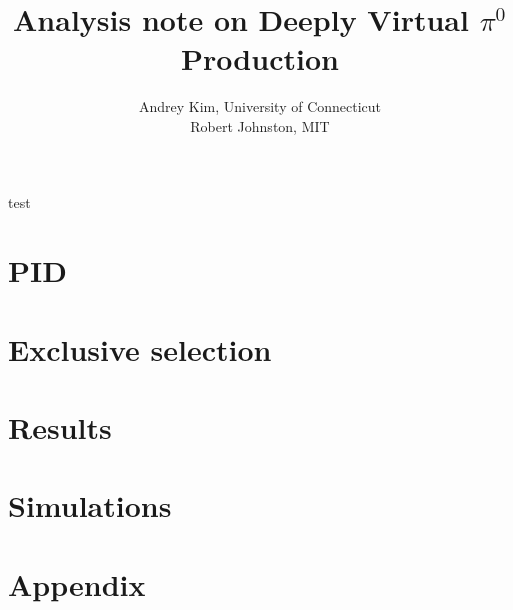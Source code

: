 \documentclass[11pt]{report}
\title{Analysis note on Deeply Virtual $\pi^0$ Production}
\author{
Andrey Kim, University of Connecticut\\
Robert Johnston, MIT\\
}
\date{}
\begin{document}
\maketitle
\tableofcontents
test
\chapter{PID}


\chapter{Exclusive selection}


\chapter{Results}


\chapter{Simulations}


\chapter{Appendix}

\end{document}
